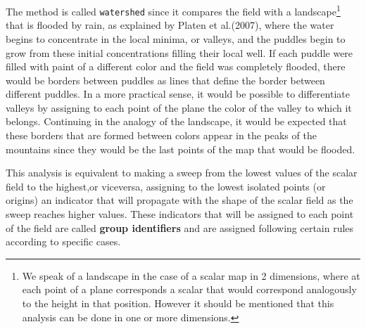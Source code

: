 The method is called \texttt{watershed} since it compares the field with a landscape\footnote{We speak of a landscape in the case of a scalar map in 2 dimensions, where at each point of a plane corresponds a scalar that would correspond analogously to the height in that position. However it should be mentioned that this analysis can be done in one or more dimensions.} that is flooded by rain, as explained by Platen et al.(2007)\cite{CosmicWatershedVoidDetection}, where the water begins to concentrate in the local minima, or valleys, and the puddles begin to grow from these initial concentrations filling their local well. If each puddle were filled with paint of a different color and the field was completely flooded, there would be borders between puddles as lines that define the border between different puddles. In a more practical sense, it would be possible to differentiate valleys by assigning to each point of the plane the color of the valley to which it belongs. Continuing in the analogy of the landscape, it would be expected that these borders that are formed between colors appear in the peaks of the mountains since they would be the last points of the map that would be flooded.

This analysis is equivalent to making a sweep from the lowest values of the scalar field to the highest,or viceversa, assigning to the lowest isolated points (or origins) an indicator that will propagate with the shape of the scalar field as the sweep reaches higher values. These indicators that will be assigned to each point of the field are called \textbf{group identifiers} and are assigned following certain rules according to specific cases.


